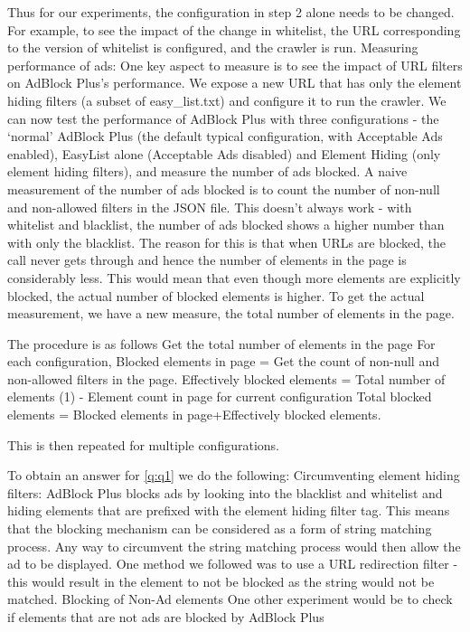Thus for our experiments, the configuration in step 2 alone needs to be changed. For example, to see the impact of the change in whitelist, the URL corresponding to the version of whitelist is configured, and the crawler is run.
Measuring performance of ads:
One key aspect to measure is to see the impact of URL filters on AdBlock Plus's performance. We expose a new URL that has only the element hiding filters (a subset of easy\_list.txt) and configure it to run the crawler. We can now test the performance of AdBlock Plus with three configurations - the ‘normal’ AdBlock Plus (the default typical configuration, with Acceptable Ads enabled), EasyList alone (Acceptable Ads disabled) and Element Hiding (only element hiding filters), and measure the number of ads blocked.
A naive measurement of the number of ads blocked is to count the number of non-null and non-allowed filters in the JSON file. This doesn’t always work - with whitelist and blacklist, the number of ads blocked shows a higher number than with only the blacklist. The reason for this is that when URLs are blocked, the call never gets through and hence the number of elements in the page is considerably less. This would mean that even though more elements are explicitly blocked, the actual number of blocked elements is higher.
To get the actual measurement, we have a new measure, the total number of elements in the page.

The procedure is as follows
Get the total number of elements in the page
For each configuration,
Blocked elements in page = Get the count of non-null and non-allowed filters in the page.
Effectively blocked elements = Total number of elements (1) - Element count in page for current configuration
Total blocked elements = Blocked elements in page+Effectively blocked elements.

This is then repeated for multiple configurations.

 To obtain an answer for \ref{q:q1} we do the following:
Circumventing element hiding filters:
AdBlock Plus blocks ads by looking into the blacklist and whitelist and hiding elements that are prefixed with the element hiding filter tag. This means that the blocking mechanism can be considered as a form of string matching process. Any way to circumvent the string matching process would then allow the ad to be displayed. One method we followed was to use a URL redirection filter - this would result in the element to not be blocked as the string would not be matched.
Blocking of Non-Ad elements
One other experiment would be to check if elements that are not ads are blocked by AdBlock Plus






